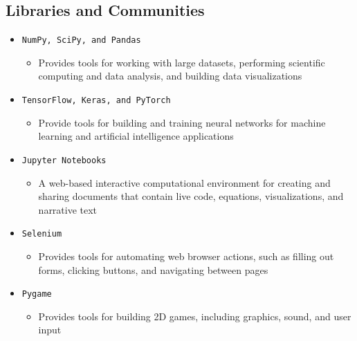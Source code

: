 \subsection{Libraries and Communities \cite{luke_hande_python_2022}}
\begin{itemize}
	\item \texttt{NumPy, SciPy, and Pandas}
	\begin{itemize}
		\item Provides tools for working with large datasets, performing scientific computing and data analysis, and building data visualizations
	\end{itemize}
	
	\item \texttt{TensorFlow, Keras, and PyTorch}
	\begin{itemize}
		\item Provide tools for building and training neural networks for machine learning and artificial intelligence applications
	\end{itemize}
	
	\item \texttt{Jupyter Notebooks}
	\begin{itemize}
		\item A web-based interactive computational environment for creating and sharing documents that contain live code, equations, visualizations, and narrative text
	\end{itemize}
	
	\item \texttt{Selenium}
	\begin{itemize}
		\item Provides tools for automating web browser actions, such as filling out forms, clicking buttons, and navigating between pages
	\end{itemize}

	\item \texttt{Pygame}
	\begin{itemize}
		\item Provides tools for building 2D games, including graphics, sound, and user input
	\end{itemize}
\end{itemize}
